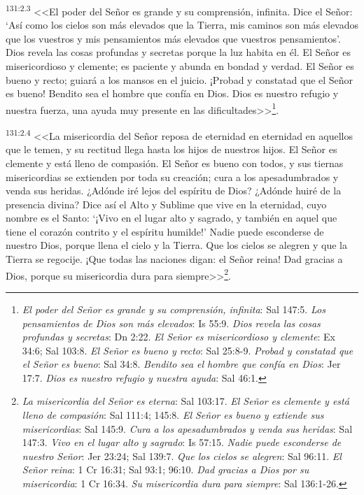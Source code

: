 \par 
\textsuperscript{131:2.3} <<El poder del Señor es grande y su comprensión, infinita. Dice el Señor: `Así como los cielos son más elevados que la Tierra, mis caminos son más elevados que los vuestros y mis pensamientos más elevados que vuestros pensamientos'. Dios revela las cosas profundas y secretas porque la luz habita en él. El Señor es misericordioso y clemente; es paciente y abunda en bondad y verdad. El Señor es bueno y recto; guiará a los mansos en el juicio. ¡Probad y constatad que el Señor es bueno! Bendito sea el hombre que confía en Dios. Dios es nuestro refugio y nuestra fuerza, una ayuda muy presente en las dificultades>>\footnote{\textit{El poder del Señor es grande y su comprensión, infinita}: Sal 147:5. \textit{Los pensamientos de Dios son más elevados}: Is 55:9. \textit{Dios revela las cosas profundas y secretas}: Dn 2:22. \textit{El Señor es misericordioso y clemente}: Ex 34:6; Sal 103:8. \textit{El Señor es bueno y recto}: Sal 25:8-9. \textit{Probad y constatad que el Señor es bueno}: Sal 34:8. \textit{Bendito sea el hombre que confía en Dios}: Jer 17:7. \textit{Dios es nuestro refugio y nuestra ayuda}: Sal 46:1.}.

\par 
\textsuperscript{131:2.4} <<La misericordia del Señor reposa de eternidad en eternidad en aquellos que le temen, y su rectitud llega hasta los hijos de nuestros hijos. El Señor es clemente y está lleno de compasión. El Señor es bueno con todos, y sus tiernas misericordias se extienden por toda su creación; cura a los apesadumbrados y venda sus heridas. ¿Adónde iré lejos del espíritu de Dios? ¿Adónde huiré de la presencia divina? Dice así el Alto y Sublime que vive en la eternidad, cuyo nombre es el Santo: `¡Vivo en el lugar alto y sagrado, y también en aquel que tiene el corazón contrito y el espíritu humilde!' Nadie puede esconderse de nuestro Dios, porque llena el cielo y la Tierra. Que los cielos se alegren y que la Tierra se regocije. ¡Que todas las naciones digan: el Señor reina! Dad gracias a Dios, porque su misericordia dura para siempre>>\footnote{\textit{La misericordia del Señor es eterna}: Sal 103:17. \textit{El Señor es clemente y está lleno de compasión}: Sal 111:4; 145:8. \textit{El Señor es bueno y extiende sus misericordias}: Sal 145:9. \textit{Cura a los apesadumbrados y venda sus heridas}: Sal 147:3. \textit{Vivo en el lugar alto y sagrado}: Is 57:15. \textit{Nadie puede esconderse de nuestro Señor}: Jer 23:24; Sal 139:7. \textit{Que los cielos se alegren}: Sal 96:11. \textit{El Señor reina}: 1 Cr 16:31; Sal 93:1; 96:10. \textit{Dad gracias a Dios por su misericordia}: 1 Cr 16:34. \textit{Su misericordia dura para siempre}: Sal 136:1-26.}.

